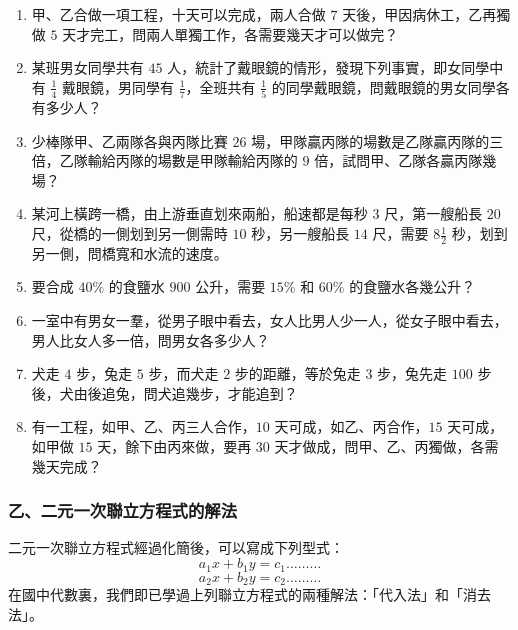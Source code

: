 \begin{enumerate}[1.]
  \item 甲、乙合做一項工程，十天可以完成，兩人合做 $7$ 天後，甲因病休工，乙再獨做 $5$ 天才完工，問兩人單獨工作，各需要幾天才可以做完？
  \item 某班男女同學共有 $45$ 人，統計了戴眼鏡的情形，發現下列事實，即女同學中有 $\frac{1}{4}$ 戴眼鏡，男同學有 $\frac{1}{7}$，全班共有 $\frac{1}{5}$ 的同學戴眼鏡，問戴眼鏡的男女同學各有多少人？
  \item 少棒隊甲、乙兩隊各與丙隊比賽 $26$ 場，甲隊贏丙隊的場數是乙隊贏丙隊的三倍，乙隊輸給丙隊的場數是甲隊輸給丙隊的 $9$ 倍，試問甲、乙隊各贏丙隊幾場？
  \item 某河上橫跨一橋，由上游垂直划來兩船，船速都是每秒 $3$ 尺，第一艘船長 $20$ 尺，從橋的一側划到另一側需時 $10$ 秒，另一艘船長 $14$ 尺，需要 $8\frac{1}{2}$ 秒，划到另一側，問橋寬和水流的速度。
  \item 要合成 $40\%$ 的食鹽水 $900$ 公升，需要 $15\%$ 和 $60\%$ 的食鹽水各幾公升？
  \item 一室中有男女一羣，從男子眼中看去，女人比男人少一人，從女子眼中看去，男人比女人多一倍，問男女各多少人？
  \item 犬走 $4$ 步，兔走 $5$ 步，而犬走 $2$ 步的距離，等於兔走 $3$ 步，兔先走 $100$ 步後，犬由後追兔，問犬追幾步，才能追到？
  \item 有一工程，如甲、乙、丙三人合作，$10$ 天可成，如乙、丙合作，$15$ 天可成，如甲做 $15$ 天，餘下由丙來做，要再 $30$ 天才做成，問甲、乙、丙獨做，各需幾天完成？
\end{enumerate}

\subsubsection*{乙、二元一次聯立方程式的解法}\label{subsec:4-3-b}

二元一次聯立方程式經過化簡後，可以寫成下列型式：
\begin{equation}\label{eq:2var_gen_1}
  a_1 x + b_1 y = c_1 \dots\dots\dots
\end{equation}
\begin{equation}\label{eq:2var_gen_2}
  a_2 x + b_2 y = c_2 \dots\dots\dots
\end{equation}
在國中代數裏，我們即已學過上列聯立方程式的兩種解法：「代入法」和「消去法」。

